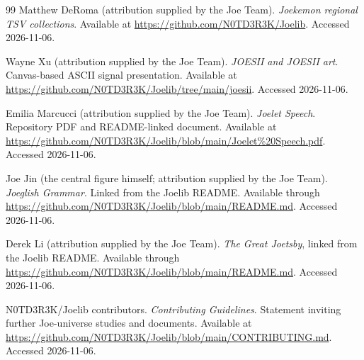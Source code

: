 \documentclass[12pt]{article}
\begin{document}
\begin{thebibliography}{99}
Matthew DeRoma (attribution supplied by the Joe Team). \emph{Joekemon regional TSV collections}. Available at \url{https://github.com/N0TD3R3K/Joelib}. Accessed 2026-11-06.

Wayne Xu (attribution supplied by the Joe Team). \emph{JOESII and JOESII art}. Canvas-based ASCII signal presentation. Available at \url{https://github.com/N0TD3R3K/Joelib/tree/main/joesii}. Accessed 2026-11-06.

Emilia Marcucci (attribution supplied by the Joe Team). \emph{Joelet Speech}. Repository PDF and README-linked document. Available at \url{https://github.com/N0TD3R3K/Joelib/blob/main/Joelet\%20Speech.pdf}. Accessed 2026-11-06.

Joe Jin (the central figure himself; attribution supplied by the Joe Team). \emph{Joeglish Grammar}. Linked from the Joelib README. Available through \url{https://github.com/N0TD3R3K/Joelib/blob/main/README.md}. Accessed 2026-11-06.

Derek Li (attribution supplied by the Joe Team). \emph{The Great Joetsby}, linked from the Joelib README. Available through \url{https://github.com/N0TD3R3K/Joelib/blob/main/README.md}. Accessed 2026-11-06.

N0TD3R3K/Joelib contributors. \emph{Contributing Guidelines}. Statement inviting further Joe-universe studies and documents. Available at \url{https://github.com/N0TD3R3K/Joelib/blob/main/CONTRIBUTING.md}. Accessed 2026-11-06.
\end{thebibliography}
\end{document}

